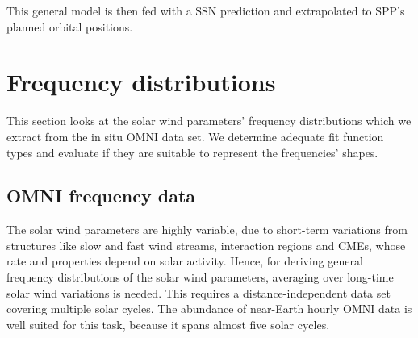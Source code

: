 This general model is then fed with a SSN prediction and extrapolated to SPP's planned orbital positions.\\
% 
% 

\section{Frequency distributions}
\label{sec:frequency_distribution}
This section looks at the solar wind parameters' frequency distributions which we extract from the in situ OMNI data set. We determine adequate fit function types and evaluate if they are suitable to represent the frequencies' shapes.

\subsection{OMNI frequency data}
\label{sec:omni_frequency_data}
The solar wind parameters are highly variable, due to short-term variations from structures like slow and fast wind streams, interaction regions and CMEs, whose rate and properties depend on solar activity. Hence, for deriving general frequency distributions of the solar wind parameters, averaging over long-time solar wind variations is needed. This requires a distance-independent data set covering multiple solar cycles. The abundance of near-Earth hourly OMNI data is well suited for this task, because it spans almost five solar cycles.

